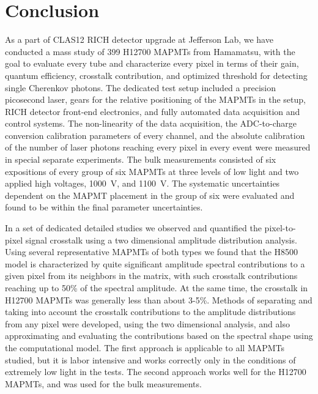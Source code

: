 \section{Conclusion}

As a part of CLAS12 RICH detector upgrade at Jefferson Lab, we have conducted a mass study of 399 H12700 MAPMTs from Hamamatsu, with the goal to evaluate every tube and characterize every pixel in terms of their gain, quantum efficiency, crosstalk contribution, and optimized threshold for detecting single Cherenkov photons. The dedicated test setup included a precision picosecond laser, gears for the relative positioning of the MAPMTs in the setup, RICH detector front-end electronics, and fully automated data acquisition and control systems. The non-linearity of the data acquisition, the ADC-to-charge conversion calibration parameters of every channel, and the absolute calibration of the number of laser photons reaching every pixel in every event were measured in special separate experiments. The bulk measurements consisted of six expositions of every group of six MAPMTs at three levels of low light and two applied high voltages, 1000~V, and 1100~V. The systematic uncertainties dependent on the MAPMT placement in the group of six were evaluated and found to be within the final parameter uncertainties.

In a set of dedicated detailed studies we observed and quantified the pixel-to-pixel signal crosstalk using a two dimensional amplitude distribution analysis. Using several representative MAPMTs of both types we found that the H8500 model is characterized by quite significant amplitude spectral contributions to a given pixel from its neighbors in the matrix, with such crosstalk contributions reaching up to 50\% of the spectral amplitude. At the same time, the crosstalk in H12700 MAPMTs was generally less than about 3-5\%. Methods of separating and taking into account the crosstalk contributions to the amplitude distributions from any pixel were developed, using the two dimensional analysis, and also approximating and evaluating the contributions based on the spectral shape using the computational model. The first approach is applicable to all MAPMTs studied, but it is labor intensive and works correctly only in the conditions of extremely low light in the tests. The second approach works well for the H12700 MAPMTs, and was used for the bulk measurements.

